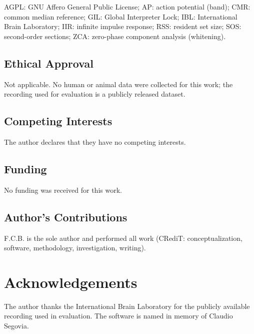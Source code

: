 \documentclass[a4paper,num-refs,gigabyte]{oup-contemporary}
\begin{document}
AGPL: GNU Affero General Public License; AP: action potential (band); CMR: common median reference; GIL: Global Interpreter Lock; IBL: International Brain Laboratory; IIR: infinite impulse response; RSS: resident set size; SOS: second-order sections; ZCA: zero-phase component analysis (whitening).

\subsection{Ethical Approval}

Not applicable. No human or animal data were collected for this work; the recording used for evaluation is a publicly released dataset.

\subsection{Competing Interests}

The author declares that they have no competing interests.

\subsection{Funding}

No funding was received for this work.

\subsection{Author's Contributions}

F.C.B. is the sole author and performed all work (CRediT: conceptualization, software, methodology, investigation, writing).

\section{Acknowledgements}

The author thanks the International Brain Laboratory for the publicly available recording used in evaluation. The software is named in memory of Claudio Segovia.


\end{document}
